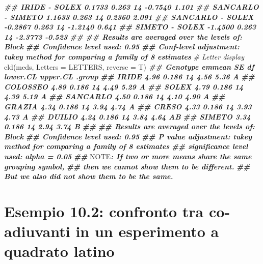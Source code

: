 \documentclass[
  12pt,
]{book}
\newenvironment{Shaded}{\begin{snugshade}}{\end{snugshade}}
\newcommand{\AlertTok}[1]{\textcolor[rgb]{0.94,0.16,0.16}{#1}}
\newcommand{\AttributeTok}[1]{\textcolor[rgb]{0.77,0.63,0.00}{#1}}
\newcommand{\CommentTok}[1]{\textcolor[rgb]{0.56,0.35,0.01}{\textit{#1}}}
\newcommand{\DocumentationTok}[1]{\textcolor[rgb]{0.56,0.35,0.01}{\textbf{\textit{#1}}}}
\newcommand{\FunctionTok}[1]{\textcolor[rgb]{0.00,0.00,0.00}{#1}}
\newcommand{\NormalTok}[1]{#1}
\begin{document}
\begin{Shaded}
\begin{Highlighting}[]
\DocumentationTok{\#\#  IRIDE {-} SOLEX         0.1733 0.263 14  {-}0.7540    1.101}
\DocumentationTok{\#\#  SANCARLO {-} SIMETO     1.1633 0.263 14   0.2360    2.091}
\DocumentationTok{\#\#  SANCARLO {-} SOLEX     {-}0.2867 0.263 14  {-}1.2140    0.641}
\DocumentationTok{\#\#  SIMETO {-} SOLEX       {-}1.4500 0.263 14  {-}2.3773   {-}0.523}
\DocumentationTok{\#\# }
\DocumentationTok{\#\# Results are averaged over the levels of: Block }
\DocumentationTok{\#\# Confidence level used: 0.95 }
\DocumentationTok{\#\# Conf{-}level adjustment: tukey method for comparing a family of 8 estimates}
\CommentTok{\# Letter display}
\FunctionTok{cld}\NormalTok{(meds, }\AttributeTok{Letters =}\NormalTok{ LETTERS, }\AttributeTok{reverse =}\NormalTok{ T)}
\DocumentationTok{\#\#  Genotype emmean    SE df lower.CL upper.CL .group}
\DocumentationTok{\#\#  IRIDE      4.96 0.186 14     4.56     5.36  A    }
\DocumentationTok{\#\#  COLOSSEO   4.89 0.186 14     4.49     5.29  A    }
\DocumentationTok{\#\#  SOLEX      4.79 0.186 14     4.39     5.19  A    }
\DocumentationTok{\#\#  SANCARLO   4.50 0.186 14     4.10     4.90  A    }
\DocumentationTok{\#\#  GRAZIA     4.34 0.186 14     3.94     4.74  A    }
\DocumentationTok{\#\#  CRESO      4.33 0.186 14     3.93     4.73  A    }
\DocumentationTok{\#\#  DUILIO     4.24 0.186 14     3.84     4.64  AB   }
\DocumentationTok{\#\#  SIMETO     3.34 0.186 14     2.94     3.74   B   }
\DocumentationTok{\#\# }
\DocumentationTok{\#\# Results are averaged over the levels of: Block }
\DocumentationTok{\#\# Confidence level used: 0.95 }
\DocumentationTok{\#\# P value adjustment: tukey method for comparing a family of 8 estimates }
\DocumentationTok{\#\# significance level used: alpha = 0.05 }
\DocumentationTok{\#\# }\AlertTok{NOTE}\DocumentationTok{: If two or more means share the same grouping symbol,}
\DocumentationTok{\#\#       then we cannot show them to be different.}
\DocumentationTok{\#\#       But we also did not show them to be the same.}
\end{Highlighting}
\end{Shaded}

\hypertarget{esempio-10.2-confronto-tra-co-adiuvanti-in-un-esperimento-a-quadrato-latino}{%
\section{Esempio 10.2: confronto tra co-adiuvanti in un esperimento a quadrato latino}\label{esempio-10.2-confronto-tra-co-adiuvanti-in-un-esperimento-a-quadrato-latino}}
\end{document}
